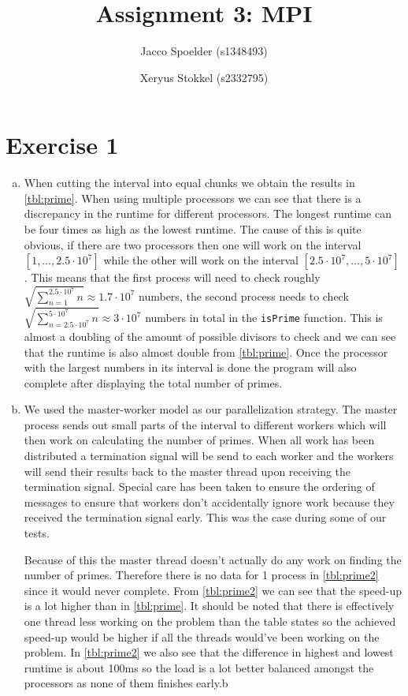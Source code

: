 \documentclass[a4paper]{article}
\title{Assignment 3: MPI}
\author{Jacco Spoelder (s1348493) \and Xeryus Stokkel (s2332795)}
\begin{document}
\maketitle

\section{Exercise 1}
\begin{enumerate}[(a)]
	\item When cutting the interval into equal chunks we obtain the results in \autoref{tbl:prime}. When using multiple processors we can see that there is a discrepancy in the runtime for different processors. The longest runtime can be four times as high as the lowest runtime. The cause of this is quite obvious, if there are two processors then one will work on the interval $[1, \ldots, 2.5 \cdot 10^7]$ while the other will work on the interval $[2.5 \cdot 10^7, \ldots, 5 \cdot 10^7]$. This means that the first process will need to check roughly $\sqrt{\sum_{n=1}^{2.5 \cdot 10^7}n} \approx 1.7 \cdot 10^7$ numbers, the second process needs to check $\sqrt{\sum_{n=2.5\cdot 10^7}^{5\cdot 10^7}n} \approx 3 \cdot 10^7$ numbers in total in the \texttt{isPrime} function. This is almost a doubling of the amount of possible divisors to check and we can see that the runtime is also almost double from \autoref{tbl:prime}. Once the processor with the largest numbers in its interval is done the program will also complete after displaying the total number of primes.
	\item We used the master-worker model as our parallelization strategy. The master process sends out small parts of the interval to different workers which will then work on calculating the number of primes. When all work has been distributed a termination signal will be send to each worker and the workers will send their results back to the master thread upon receiving the termination signal. Special care has been taken to ensure the ordering of messages to ensure that workers don't accidentally ignore work because they received the termination signal early. This was the case during some of our tests.
	
	Because of this the master thread doesn't actually do any work on finding the number of primes. Therefore there is no data for 1 process in \autoref{tbl:prime2} since it would never complete. From \autoref{tbl:prime2} we can see that the speed-up is a lot higher than in \autoref{tbl:prime}. It should be noted that there is effectively one thread less working on the problem than the table states so the achieved speed-up would be higher if all the threads would've been working on the problem. In \autoref{tbl:prime2} we also see that the difference in highest and lowest runtime is about 100ms so the load is a lot better balanced amongst the processors as none of them finishes early.b
\end{enumerate}
\end{document}
